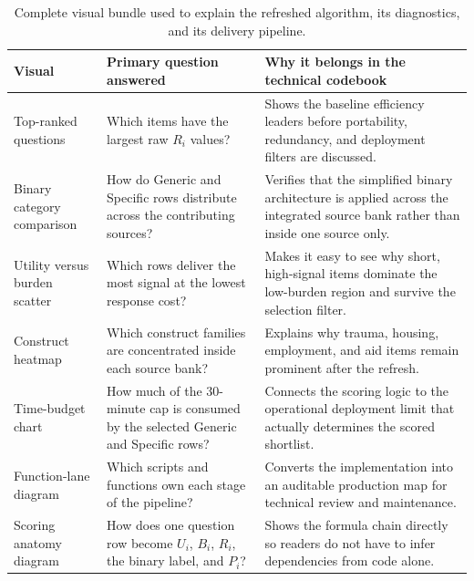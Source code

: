 \documentclass[12pt]{article}
\begin{document}
\begin{table}[H]
\centering
\footnotesize
\begin{tabularx}{\textwidth}{L{0.22\textwidth} Y Y}
\toprule
Visual & Primary question answered & Why it belongs in the technical codebook \\
\midrule
Top-ranked questions & Which items have the largest raw $R_i$ values? & Shows the baseline efficiency leaders before portability, redundancy, and deployment filters are discussed. \\
Binary category comparison & How do Generic and Specific rows distribute across the contributing sources? & Verifies that the simplified binary architecture is applied across the integrated source bank rather than inside one source only. \\
Utility versus burden scatter & Which rows deliver the most signal at the lowest response cost? & Makes it easy to see why short, high-signal items dominate the low-burden region and survive the selection filter. \\
Construct heatmap & Which construct families are concentrated inside each source bank? & Explains why trauma, housing, employment, and aid items remain prominent after the refresh. \\
Time-budget chart & How much of the 30-minute cap is consumed by the selected Generic and Specific rows? & Connects the scoring logic to the operational deployment limit that actually determines the scored shortlist. \\
Function-lane diagram & Which scripts and functions own each stage of the pipeline? & Converts the implementation into an auditable production map for technical review and maintenance. \\
Scoring anatomy diagram & How does one question row become $U_i$, $B_i$, $R_i$, the binary label, and $P_i$? & Shows the formula chain directly so readers do not have to infer dependencies from code alone. \\
\bottomrule
\end{tabularx}
\caption{Complete visual bundle used to explain the refreshed algorithm, its diagnostics, and its delivery pipeline.}
\end{table}

\end{document}
